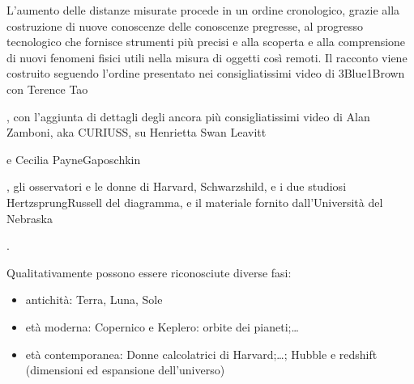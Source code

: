 \documentclass[letterpaper,10pt,italian]{jupyterBook}
\begin{document}
\sphinxAtStartPar
L’aumento delle distanze misurate procede in un ordine cronologico, grazie alla costruzione di nuove conoscenze delle conoscenze pregresse, al progresso tecnologico che fornisce strumenti più precisi e alla scoperta e alla comprensione di nuovi fenomeni fisici utili nella misura di oggetti così remoti. Il racconto viene costruito seguendo l’ordine presentato nei consigliatissimi video di 3Blue1Brown con Terence Tao%
\begin{footnote}[1]\sphinxAtStartFootnote
{}
%
\end{footnote}%
\begin{footnote}[2]\sphinxAtStartFootnote
{}
%
\end{footnote}, con l’aggiunta di dettagli degli ancora più consigliatissimi video di Alan Zamboni, aka CURIUSS, su Henrietta Swan Leavitt%
\begin{footnote}[3]\sphinxAtStartFootnote
{}
%
\end{footnote} e Cecilia Payne\sphinxhyphen{}Gaposchkin%
\begin{footnote}[4]\sphinxAtStartFootnote
{}
%
\end{footnote}, gli osservatori e le donne di Harvard, Schwarzshild, e i due studiosi Hertzsprung\sphinxhyphen{}Russell del diagramma, e il materiale fornito dall’Università del Nebraska%
\begin{footnote}[5]\sphinxAtStartFootnote
{}
%
\end{footnote}.

\sphinxAtStartPar
Qualitativamente possono essere riconosciute diverse fasi:
\begin{itemize}
\item {} 
\sphinxAtStartPar
antichità: Terra, Luna, Sole

\item {} 
\sphinxAtStartPar
età moderna: Copernico e Keplero: orbite dei pianeti;…

\item {} 
\sphinxAtStartPar
età contemporanea: Donne calcolatrici di Harvard;…; Hubble e red\sphinxhyphen{}shift (dimensioni ed espansione dell’universo)

\end{itemize}
\end{document}
